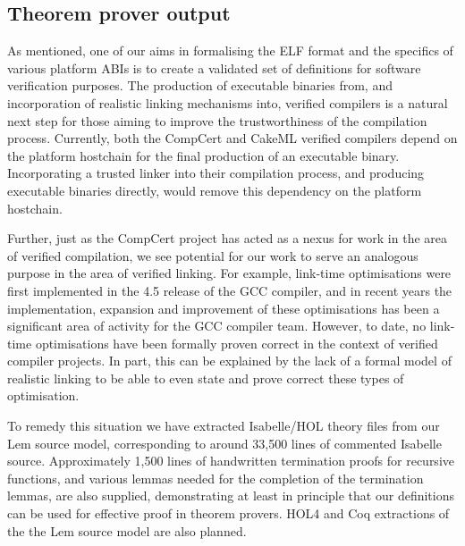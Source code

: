 \subsection{Theorem prover output}
\label{subsect.theorem.prover.output}

As mentioned, one of our aims in formalising the ELF format and the specifics of various platform ABIs is to create a validated set of definitions for software verification purposes.
The production of executable binaries from, and incorporation of realistic linking mechanisms into, verified compilers is a natural next step for those aiming to improve the trustworthiness of the compilation process.
Currently, both the CompCert and CakeML verified compilers depend on the platform hostchain for the final production of an executable binary.
Incorporating a trusted linker into their compilation process, and producing executable binaries directly, would remove this dependency on the platform hostchain.

Further, just as the CompCert project has acted as a nexus for work in the area of verified compilation, we see potential for our work to serve an analogous purpose in the area of verified linking.
For example, link-time optimisations were first implemented in the 4.5 release of the GCC compiler, and in recent years the implementation, expansion and improvement of these optimisations has been a significant area of activity for the GCC compiler team.
However, to date, no link-time optimisations have been formally proven correct in the context of verified compiler projects.
In part, this can be explained by the lack of a formal model of realistic linking to be able to even state and prove correct these types of optimisation.

To remedy this situation we have extracted Isabelle/HOL theory files from our Lem source model, corresponding to around 33,500 lines of commented Isabelle source.
Approximately 1,500 lines of handwritten termination proofs for recursive functions, and various lemmas needed for the completion of the termination lemmas, are also supplied, demonstrating at least in principle that our definitions can be used for effective proof in theorem provers.
HOL4 and Coq extractions of the the Lem source model are also planned.
